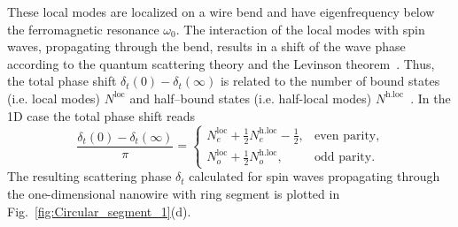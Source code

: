 These local modes are localized on a wire bend and have eigenfrequency below the ferromagnetic resonance $\omega_0$. The interaction of the local modes with spin waves, propagating through the bend, results in a shift of the wave phase according to the quantum scattering theory and the Levinson theorem~\cite{Swan63}. Thus, the total phase shift $\delta_t(0)-\delta_t(\infty)$ is related to the number of bound states (i.e. local modes) $N^{\text{loc}}$ and half--bound states (i.e. half-local modes) $N^{\text{h.loc}}$~\cite{Ma06a}. 
In the 1D case the total phase shift reads~\cite{Dong00b}
\begin{equation} \label{eq:Levinson}
\frac{\delta_t(0)-\delta_t(\infty)}{\pi} = 
\begin{cases}
N_e^{\text{loc}} + \frac12 N_e^{\text{h.loc}} -\frac12, 	& \text{even parity},\\
N_o^{\text{loc}} + \frac12 N_o^{\text{h.loc}}, 			& \text{odd parity}.
\end{cases}
\end{equation}
The resulting scattering phase $\delta_t$ calculated for spin waves propagating through the one-dimensional nanowire with ring segment is plotted in Fig.~\ref{fig:Circular_segment_1}(d).